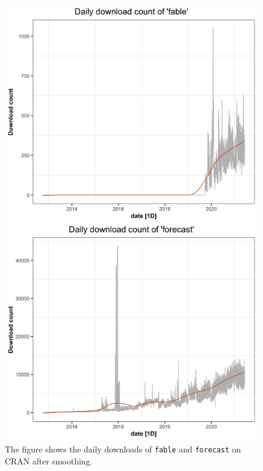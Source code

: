 \documentclass[
]{book}
\begin{document}
\begin{figure}

{\centering \includegraphics{figures/example-adjust-1} 

}

\caption{The figure shows the daily downloads of \texttt{fable} and \texttt{forecast} on CRAN after smoothing.}\label{fig:example-adjust}
\end{figure}
\end{document}
